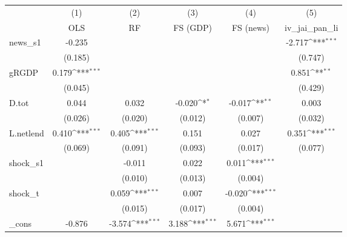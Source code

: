 {
\def\sym#1{\ifmmode^{#1}\else\(^{#1}\)\fi}
\begin{tabular}{l*{5}{c}}
\toprule
            &\multicolumn{1}{c}{(1)}&\multicolumn{1}{c}{(2)}&\multicolumn{1}{c}{(3)}&\multicolumn{1}{c}{(4)}&\multicolumn{1}{c}{(5)}\\
            &\multicolumn{1}{c}{OLS}&\multicolumn{1}{c}{RF}&\multicolumn{1}{c}{FS (GDP)}&\multicolumn{1}{c}{FS (news)}&\multicolumn{1}{c}{iv\_jai\_pan\_li}\\
\midrule
news\_s1     &      -0.235         &                     &                     &                     &      -2.717\sym{***}\\
            &     (0.185)         &                     &                     &                     &     (0.747)         \\
\addlinespace
gRGDP       &       0.179\sym{***}&                     &                     &                     &       0.851\sym{**} \\
            &     (0.045)         &                     &                     &                     &     (0.429)         \\
\addlinespace
D.tot       &       0.044         &       0.032         &      -0.020\sym{*}  &      -0.017\sym{**} &       0.003         \\
            &     (0.026)         &     (0.020)         &     (0.012)         &     (0.007)         &     (0.032)         \\
\addlinespace
L.netlend   &       0.410\sym{***}&       0.405\sym{***}&       0.151         &       0.027         &       0.351\sym{***}\\
            &     (0.069)         &     (0.091)         &     (0.093)         &     (0.017)         &     (0.077)         \\
\addlinespace
shock\_s1    &                     &      -0.011         &       0.022         &       0.011\sym{***}&                     \\
            &                     &     (0.010)         &     (0.013)         &     (0.004)         &                     \\
\addlinespace
shock\_t     &                     &       0.059\sym{***}&       0.007         &      -0.020\sym{***}&                     \\
            &                     &     (0.015)         &     (0.017)         &     (0.004)         &                     \\
\addlinespace
\_cons      &      -0.876         &      -3.574\sym{***}&       3.188\sym{***}&       5.671\sym{***}&                     \\

\end{tabular}}
